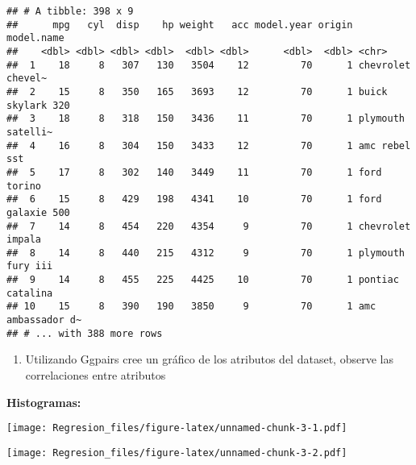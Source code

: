 \documentclass[]{article}
\newenvironment{Shaded}{\begin{snugshade}}{\end{snugshade}}
\newcommand{\KeywordTok}[1]{\textcolor[rgb]{0.13,0.29,0.53}{\textbf{#1}}}
\newcommand{\NormalTok}[1]{#1}
\newcommand{\OperatorTok}[1]{\textcolor[rgb]{0.81,0.36,0.00}{\textbf{#1}}}
\providecommand{\tightlist}{%
  \setlength{\itemsep}{0pt}\setlength{\parskip}{0pt}}
\begin{document}
\begin{verbatim}
## # A tibble: 398 x 9
##      mpg   cyl  disp    hp weight   acc model.year origin model.name       
##    <dbl> <dbl> <dbl> <dbl>  <dbl> <dbl>      <dbl>  <dbl> <chr>            
##  1    18     8   307   130   3504    12         70      1 chevrolet chevel~
##  2    15     8   350   165   3693    12         70      1 buick skylark 320
##  3    18     8   318   150   3436    11         70      1 plymouth satelli~
##  4    16     8   304   150   3433    12         70      1 amc rebel sst    
##  5    17     8   302   140   3449    11         70      1 ford torino      
##  6    15     8   429   198   4341    10         70      1 ford galaxie 500 
##  7    14     8   454   220   4354     9         70      1 chevrolet impala 
##  8    14     8   440   215   4312     9         70      1 plymouth fury iii
##  9    14     8   455   225   4425    10         70      1 pontiac catalina 
## 10    15     8   390   190   3850     9         70      1 amc ambassador d~
## # ... with 388 more rows
\end{verbatim}

\begin{enumerate}
\def\labelenumi{\arabic{enumi}.}
\setcounter{enumi}{1}
\tightlist
\item
  Utilizando Ggpairs cree un gráfico de los atributos del dataset,
  observe las correlaciones entre atributos 
\end{enumerate}

\textbf{Histogramas:}

\begin{Shaded}
\end{Shaded}

\texttt{[image: Regresion\_files/figure-latex/unnamed-chunk-3-1.pdf]}

\begin{Shaded}
\end{Shaded}

\texttt{[image: Regresion\_files/figure-latex/unnamed-chunk-3-2.pdf]}

\begin{Shaded}
\end{Shaded}
\end{document}
